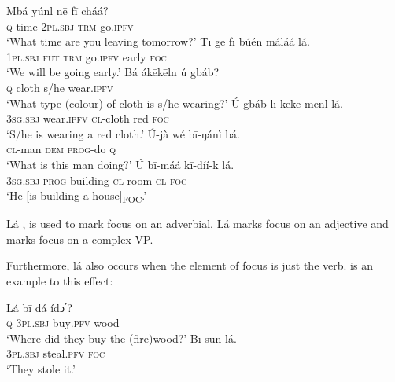 \documentclass[output=paper,colorlinks,citecolor=brown]{langscibook}
\begin{document}
\ea%
    \label{ex:bisilki:26}
    \ea\label{ex:bisilki:26a}
        \ea\label{ex:bisilki:26ai}
        \gll    Mbá	yúnl	nē		fī	cháá?\\
                \textsc{q}	time	\textsc{2pl.sbj}	\textsc{trm}	go\textsc{.ipfv}\\
        \glt    ‘What time are you leaving tomorrow?’
        \ex\label{ex:bisilki:26aii}
        \gll    Tī		gē	fī	búén	máláá		lá.\\
                \textsc{1pl.sbj}	\textsc{fut}	\textsc{trm}	go\textsc{.ipfv}  early	\textsc{foc}\\
        \glt    ‘We will be going early.’
        \z
    \ex\label{ex:bisilki:26b}
        \ea\label{ex:bisilki:26bi}
        \gll    Bá	ákēkēln	ú	gbáb?\\
                \textsc{q}	cloth		s/he	wear\textsc{.ipfv}\\
        \glt    ‘What type (colour) of cloth is s/he wearing?’
        \ex\label{ex:bisilki:26bii}
        \gll    Ú	gbáb	lī-kēkē	mēnl		lá.\\
                \textsc{3sg.sbj}	wear\textsc{.ipfv}	\textsc{cl-}cloth	red	\textsc{foc}\\
        \glt    ‘S/he is wearing a red cloth.’
        \z
    \ex\label{ex:bisilki:26c}
        \ea\label{ex:bisilki:26ci}
        \gll    Ú-jà		wé	bī-ŋánì	bá.\\
                \textsc{cl-}man	\textsc{dem}	\textsc{prog-}do	\textsc{q}\\
        \glt    ‘What is this man doing?’
        \ex\label{ex:bisilki:26cii}
        \gll    Ú		bī-máá		kī-díí-k		lá.\\
                \textsc{3sg.sbj}	\textsc{prog-}building	\textsc{cl-}room\textsc{-cl}		\textsc{foc}\\
        \glt    ‘He [is building a house]\textsubscript{FOC}.’
        \z
    
    \z
\z

Lá , is used to mark focus on an adverbial. Lá marks focus on an adjective and  marks focus on a complex VP.

Furthermore, lá also occurs when the element of focus is just the verb.  is an example to this effect:

\ea%
    \label{ex:bisilki:27}
    \ea\label{ex:bisilki:27a}
    \gll    Lá	bī		dá		ídↄ՛?\\
            \textsc{q}	\textsc{3pl.sbj}	buy\textsc{.pfv}	wood\\
    \glt    ‘Where did they buy the (fire)wood?’
    \ex\label{ex:bisilki:27b}
    \gll    Bī		sūn		lá.\\
            \textsc{3pl.sbj}	steal\textsc{.pfv}	\textsc{foc}\\
    \glt    ‘They stole it.’
    \z
\z
\end{document}
